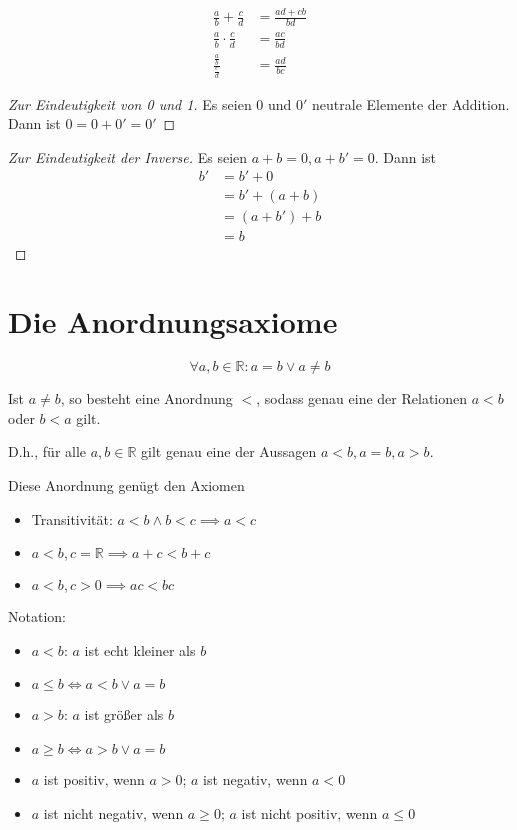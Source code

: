 \begin{theorem}
  \begin{align*}
    \frac{a}{b} + \frac{c}{d} &= \frac{ad+cb}{bd} \\
    \frac{a}{b} \cdot \frac{c}{d} &= \frac{ac}{bd} \\
    \frac{\frac{a}{b}}{\frac{c}{d}} &= \frac{ad}{bc}
  \end{align*}
\end{theorem}

\begin{proof}[Zur Eindeutigkeit von 0 und 1]
  Es seien 0 und $0'$ neutrale Elemente der Addition. Dann ist $0 = 0 + 0' = 0'$
\end{proof}
\begin{proof}[Zur Eindeutigkeit der Inverse]
  Es seien $a + b = 0, a + b' = 0$. Dann ist
  \begin{align*}
    b' &= b' + 0 \\
    \,&= b' + (a + b) \\
    \,&= (a + b') + b \\
    \,&= b
  \end{align*}
\end{proof}

\section{Die Anordnungsaxiome}
\[ \forall a, b \in \mathbb{R}: a = b \vee a \ne b \]

Ist $a \ne b$, so besteht eine Anordnung $<$, sodass genau eine der Relationen $a < b$ oder $b < a$ gilt.

D.h., für alle $a, b \in \mathbb{R}$ gilt genau eine der Aussagen $a < b, a = b, a > b$.

Diese Anordnung genügt den Axiomen
\begin{itemize}
\item Transitivität: $a < b \wedge b < c \implies a < c$
\item $a < b, c = \mathbb{R} \implies a + c < b + c$
\item $a < b, c > 0 \implies ac < bc$
\end{itemize}

\begin{definition}
  Notation:
  \begin{itemize}
  \item $a < b$: $a$ ist echt kleiner als $b$
  \item $a \le b \iff a < b \vee a = b$
  \item $a > b$: $a$ ist größer als $b$
  \item $a \ge b \iff a > b \vee a = b$
  \item $a$ ist positiv, wenn $a > 0$; $a$ ist negativ, wenn $a < 0$
  \item $a$ ist nicht negativ, wenn $a \ge 0$; $a$ ist nicht positiv, wenn $a \le 0$
  \end{itemize}
\end{definition}

